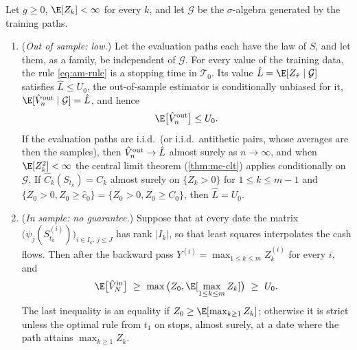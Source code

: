 \begin{proposition}\label{prop:am-lsm}
Let $g\ge0$, $\E[Z_k]<\infty$ for every $k$, and let $\mathcal G$ be the $\sigma$-algebra
generated by the training paths.
\begin{enumerate}[label=(\roman*)]
  \item (\emph{Out of sample: low.}) Let the evaluation paths each have the law of $S$, and
    let them, as a family, be independent of $\mathcal G$. For every value of the training
    data, the rule \eqref{eq:am-rule} is a stopping time in $\mathcal T_0$. Its value
    $\hat L=\E[Z_{\hat\tau}\mid\mathcal G]$ satisfies $\hat L\le U_0$, the out-of-sample
    estimator is conditionally unbiased for it, $\E[\hat V^{\rm out}_n\mid\mathcal G]=\hat L$,
    and hence
    \[
      \E\big[\hat V^{\rm out}_n\big]\le U_0 .
    \]
    If the evaluation paths are i.i.d.\ (or i.i.d.\ antithetic pairs, whose averages are then
    the samples), then $\hat V^{\rm out}_n\to\hat L$ almost surely as $n\to\infty$, and when
    $\E[Z_k^2]<\infty$ the central limit theorem (\cref{thm:mc-clt}) applies conditionally
    on $\mathcal G$. If
    $\hat C_k(S_{t_k})=C_k$ almost surely on $\{Z_k>0\}$ for $1\le k\le m-1$ and
    $\{Z_0>0,Z_0\ge\hat c_0\}=\{Z_0>0,Z_0\ge C_0\}$, then $\hat L=U_0$.
  \item (\emph{In sample: no guarantee.}) Suppose that at every date the matrix
    $\big(\psi_j(S^{(i)}_{t_k})\big)_{i\in I_k,\,j\le J}$ has rank $|I_k|$, so that least
    squares interpolates the cash flows. Then after the backward pass
    $Y^{(i)}=\max_{1\le k\le m}Z^{(i)}_k$ for every $i$, and
    \[
      \E\big[\hat V^{\rm in}_N\big]\ \ge\ \max\big(Z_0,\E[\max_{1\le k\le m}Z_k]\big)\ \ge\ U_0 .
    \]
    The last inequality is an equality if $Z_0\ge\E[\max_{k\ge1}Z_k]$; otherwise it is strict
    unless the optimal rule from $t_1$ on stops, almost surely, at a date where the path
    attains $\max_{k\ge1}Z_k$.
\end{enumerate}
\end{proposition}

